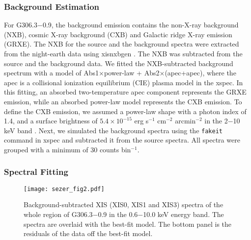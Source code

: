\documentclass[useAMS,usenatbib]{mn2e}
\begin{document}
\subsubsection {Background Estimation}
For G306.3$-$0.9, the background emission contains the non-X-ray background (NXB), cosmic X-ray background (CXB) and Galactic ridge X-ray emission (GRXE). The NXB for the source and the background spectra were extracted from the night-earth data using {\sc xisnxbgen} \citep {Ta08}. The NXB was subtracted from the source and the background data. We fitted the NXB-subtracted background spectrum with a model of Abs1$\times$power-law + Abs2$\times$(apec+apec), where the apec is a collisional ionization equilibrium (CIE) plasma model in the {\sc xspec}. In this fitting, an absorbed two-temperature apec component represents the GRXE emission, while an absorbed power-law model represents the CXB emission. To define the CXB emission, we assumed a power-law shape with a photon index of 1.4, and a surface brightness of $5.4\times10^{-15}$ erg s$^{-1}$ cm$^{-2}$ arcmin$^{-2}$ in the 2$-$10 keV band \citep {Ku02}. Next, we simulated the background spectra using the \texttt{fakeit} command in {\sc xspec} and subtracted it from the source spectra. All spectra were grouped with a minimum of 30 counts bin$^{-1}$.

\subsubsection {Spectral Fitting}

\begin{figure}
\centering \vspace*{1pt}
\texttt{[image: sezer\_fig2.pdf]}
\caption{Background-subtracted XIS (XIS0, XIS1 and XIS3) spectra of the whole region of G306.3$-$0.9 in the 0.6$-$10.0 keV energy band.  The spectra are overlaid with the best-fit model. The bottom panel is the residuals of the data off the best-fit model.}
\label{figure_2}
\end{figure}
\end{document}
